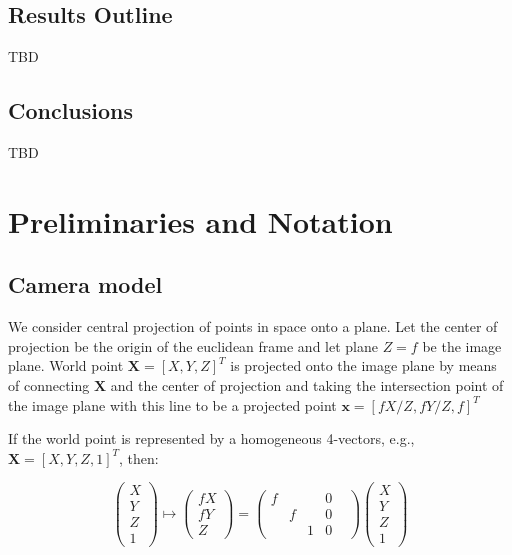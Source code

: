 \documentclass[MSc,beforeExam]{iitcsthesis}
\begin{document}
\subsection{Results Outline}
TBD

\subsection{Conclusions}
TBD
\section{Preliminaries and Notation}

\subsection{Camera model}

We consider central projection of points in space onto a plane. Let
the center of projection be the origin of the euclidean frame and let
plane $Z=f$ be the image plane. World point $\mathbf{X}=[X,Y,Z]^T$ is
projected onto the image plane by means of connecting $\mathbf{X}$ and
the center of projection and taking the intersection point of the
image plane with this line to be a projected point
$\mathbf{x}=[fX/Z,fY/Z,f]^T$


If the world point is represented by a homogeneous 4-vectors, e.g.,
$\mathbf{X} = [X,Y,Z,1]^T$, then:

\begin{equation}\label{eq:central_projection}
\begin{pmatrix}
X\\ Y\\ Z\\ 1
\end{pmatrix}
\mapsto
\begin{pmatrix}
fX\\ fY\\ Z
\end{pmatrix}
=
\begin{pmatrix}
f& & &0& \\
 &f& &0& \\
 & &1&0&
\end{pmatrix}
\begin{pmatrix}
X\\ Y\\ Z\\ 1
\end{pmatrix}
\end{equation}
\end{document}
